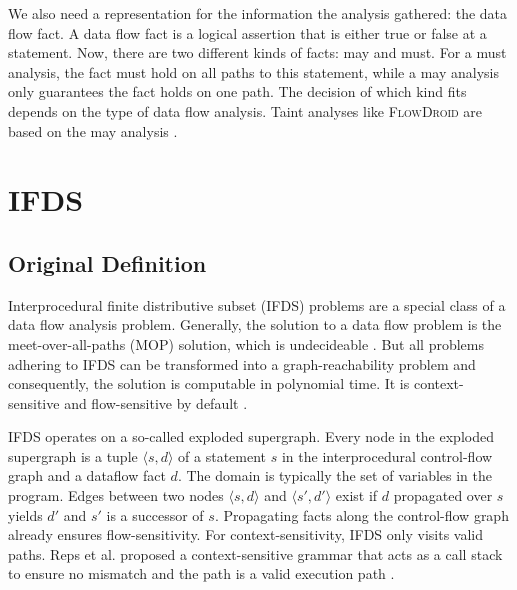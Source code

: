 \documentclass[../draft.tex]{subfiles}
\begin{document}
    We also need a representation for the information the analysis gathered: the data flow fact. A data flow fact is a logical assertion that is either true or false at a statement. Now, there are two different kinds of facts: may and must. For a must analysis, the fact must hold on all paths to this statement, while a may analysis only guarantees the fact holds on one path. The decision of which kind fits depends on the type of data flow analysis. Taint analyses like \textsc{FlowDroid} are based on the may analysis \cite{Arzt2017PhD}.
    



    \section{IFDS}\label{s:ifds}
    \subsection{Original Definition}
    Interprocedural finite distributive subset (IFDS) problems are a special class of a data flow analysis problem. Generally, the solution to a data flow problem is the meet-over-all-paths (MOP) solution, which is undecideable \cite{Rice1953}. But all problems adhering to IFDS can be transformed into a graph-reachability problem and consequently, the solution is computable in polynomial time. It is context-sensitive and flow-sensitive by default \cite{Reps1995}.

    IFDS operates on a so-called exploded supergraph. Every node in the exploded supergraph is a tuple $\langle s, d \rangle$ of a statement $s$ in the interprocedural control-flow graph and a dataflow fact $d$. The domain is typically the set of variables in the program. Edges between two nodes $\langle s, d \rangle$ and $\langle s', d' \rangle$ exist if $d$ propagated over $s$ yields $d'$ and $s'$ is a successor of $s$. Propagating facts along the control-flow graph already ensures flow-sensitivity.
    For context-sensitivity, IFDS only visits valid paths. Reps et al. proposed a context-sensitive grammar that acts as a call stack to ensure no mismatch and the path is a valid execution path \cite{Reps1995}.
\end{document}
